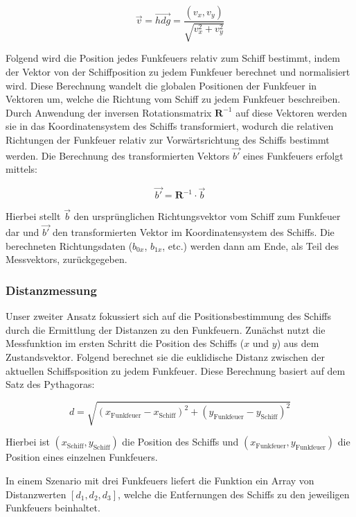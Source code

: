 \documentclass[conference]{IEEEtran}[10pt]
\begin{document}
\[
\vec{v} = \vec{hdg} = \frac{(v_x, v_y)}{\sqrt{v_x^2 + v_y^2}}
\]


Folgend wird die Position jedes Funkfeuers relativ zum Schiff bestimmt, indem der Vektor von der Schiffposition zu jedem Funkfeuer berechnet und normalisiert wird. Diese Berechnung wandelt die globalen Positionen der Funkfeuer in Vektoren um, welche die Richtung vom Schiff zu jedem Funkfeuer beschreiben. Durch Anwendung der inversen Rotationsmatrix \( \mathbf{R}^{-1} \) auf diese Vektoren werden sie in das Koordinatensystem des Schiffs transformiert, wodurch die relativen Richtungen der Funkfeuer relativ zur Vorwärtsrichtung des Schiffs bestimmt werden. Die Berechnung des transformierten Vektors \( \vec{b'} \) eines Funkfeuers erfolgt mittels:

\[
\vec{b'} = \mathbf{R}^{-1} \cdot \vec{b}
\]

Hierbei stellt \( \vec{b} \) den ursprünglichen Richtungsvektor vom Schiff zum Funkfeuer dar und \( \vec{b'} \) den transformierten Vektor im Koordinatensystem des Schiffs. Die berechneten Richtungsdaten (\(b_{0x}\), \(b_{1x}\), etc.) werden dann am Ende, als Teil des Messvektors, zurückgegeben.





\subsubsection{Distanzmessung}

Unser zweiter Ansatz fokussiert sich auf die Positionsbestimmung des Schiffs durch die Ermittlung der Distanzen zu den Funkfeuern. Zunächst nutzt die Messfunktion im ersten Schritt die Position des Schiffs (\(x\) und \(y\)) aus dem Zustandsvektor. Folgend berechnet sie die euklidische Distanz zwischen der aktuellen Schiffsposition zu jedem Funkfeuer. Diese Berechnung basiert auf dem Satz des Pythagoras:

\[
d = \sqrt{(x_{\text{Funkfeuer}} - x_{\text{Schiff}})^2 + (y_{\text{Funkfeuer}} - y_{\text{Schiff}})^2}
\]

Hierbei ist \((x_{\text{Schiff}}, y_{\text{Schiff}})\) die Position des Schiffs und \((x_{\text{Funkfeuer}}, y_{\text{Funkfeuer}})\) die Position eines einzelnen Funkfeuers.

In einem Szenario mit drei Funkfeuers liefert die Funktion ein Array von Distanzwerten \([d_1, d_2, d_3]\), welche die Entfernungen des Schiffs zu den jeweiligen Funkfeuers beinhaltet.
\end{document}

